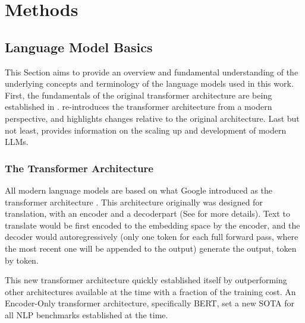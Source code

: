 \chapter{Methods}\label{chap:methods}


\section{Language Model Basics}\label{sec:basics}
This Section aims to provide an overview and fundamental understanding of the underlying concepts and terminology of the language models used in this work.
First, the fundamentals of the original transformer architecture are being established in .
 re-introduces the transformer architecture from a modern perspective, and highlights changes relative to the original architecture.
Last but not least,  provides information on the scaling up and development of modern \glspl{LLM}.



\subsection{The Transformer Architecture}\label{sub:transformer}
All modern language models are based on what \gls{Google} introduced as the transformer architecture \cite{vaswani_attention_2017}. 
This architecture originally was designed for translation, with an encoder and a decoderpart (See  for more details).
Text to translate would be first encoded to the embedding space by the encoder, and the decoder would autoregressively (only one token for each full forward pass, where the most recent one will be appended to the output) generate the output, token by token.

This new transformer architecture quickly established itself by outperforming other architectures available at the time with a fraction of the training cost.
An Encoder-Only transformer architecture, specifically \gls{BERT}, set a new \gls{SOTA} for all \gls{NLP} benchmarks established at the time.


